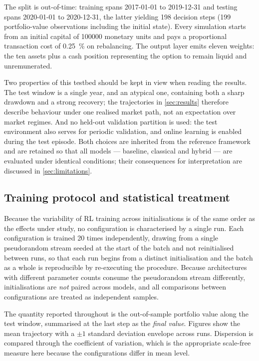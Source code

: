 \documentclass[aps,floatfix,superscriptaddress,twocolumn,tightenlines,amsmath,amssymb,nofootinbib,10pt,longbibliography,prl]{revtex4-2}
\begin{document}
The split is out-of-time: training spans 2017-01-01 to 2019-12-31 and testing
spans 2020-01-01 to 2020-12-31, the latter yielding \num{198} decision steps
(\num{199} portfolio-value observations including the initial state). Every
simulation starts from an initial capital of \num{100000} monetary units and
pays a proportional transaction cost of \SI{0.25}{\percent} on rebalancing. The
output layer emits eleven weights: the ten assets plus a cash position
representing the option to remain liquid and unremunerated.

Two properties of this testbed should be kept in view when reading the results.
The test window is a single year, and an atypical one, containing both a sharp
drawdown and a strong recovery; the trajectories in \ref{sec:results} therefore
describe behaviour under one realised market path, not an expectation over
market regimes. And no held-out validation partition is used: the test
environment also serves for periodic validation, and online learning is enabled
during the test episode. Both choices are inherited from the reference framework
and are retained so that all models --- baseline, classical and hybrid --- are
evaluated under identical conditions; their consequences for interpretation are
discussed in \ref{sec:limitations}.

\subsection{Training protocol and statistical treatment}
\label{subsec:protocol}

Because the variability of RL training across initialisations is of the same
order as the effects under study, no configuration is characterised by a single
run. Each configuration is trained \num{20} times independently, drawing from a
single pseudorandom stream seeded at the start of the batch and not
reinitialised between runs, so that each run begins from a distinct
initialisation and the batch as a whole is reproducible by re-executing the
procedure. Because architectures with different parameter counts consume the
pseudorandom stream differently, initialisations are \emph{not} paired across
models, and all comparisons between configurations are treated as independent
samples.

The quantity reported throughout is the out-of-sample portfolio value along the
test window, summarised at the last step as the \emph{final value}. Figures show
the mean trajectory with a $\pm 1$ standard deviation envelope across runs.
Dispersion is compared through the coefficient of variation, which is the
appropriate scale-free measure here because the configurations differ in mean
level.
\end{document}
